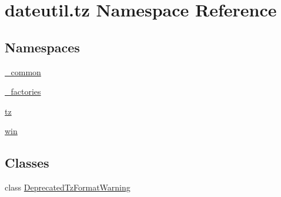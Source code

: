 \hypertarget{namespacedateutil_1_1tz}{}\section{dateutil.\+tz Namespace Reference}
\label{namespacedateutil_1_1tz}
\subsection*{Namespaces}
\begin{DoxyCompactItemize}
\item 
 \hyperlink{namespacedateutil_1_1tz_1_1__common}{\+\_\+common}
\item 
 \hyperlink{namespacedateutil_1_1tz_1_1__factories}{\+\_\+factories}
\item 
 \hyperlink{namespacedateutil_1_1tz_1_1tz}{tz}
\item 
 \hyperlink{namespacedateutil_1_1tz_1_1win}{win}
\end{DoxyCompactItemize}
\subsection*{Classes}
\begin{DoxyCompactItemize}
\item 
class \hyperlink{classdateutil_1_1tz_1_1DeprecatedTzFormatWarning}{Deprecated\+Tz\+Format\+Warning}
\end{DoxyCompactItemize}
